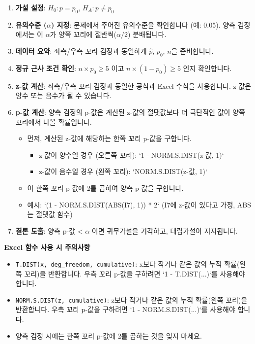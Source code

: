 \documentclass[11pt,a4paper]{article}
\begin{document}
\begin{enumerate}
    \item \textbf{가설 설정}: $H_0: p = p_0$, $H_A: p \ne p_0$
    \item \textbf{유의수준 ($\alpha$) 지정}: 문제에서 주어진 유의수준을 확인합니다 (예: 0.05). 양측 검정에서는 이 $\alpha$가 양쪽 꼬리에 절반씩($\alpha/2$) 분배됩니다.
    \item \textbf{데이터 요약}: 좌측/우측 꼬리 검정과 동일하게 $\hat{p}$, $p_0$, $n$을 준비합니다.
    \item \textbf{정규 근사 조건 확인}: $n \times p_0 \ge 5$ 이고 $n \times (1 - p_0) \ge 5$ 인지 확인합니다.
    \item \textbf{z-값 계산}: 좌측/우측 꼬리 검정과 동일한 공식과 Excel 수식을 사용합니다. z-값은 양수 또는 음수가 될 수 있습니다.
    \item \textbf{p-값 계산}: 양측 검정의 p-값은 계산된 z-값의 절댓값보다 더 극단적인 값이 양쪽 꼬리에서 나올 확률입니다.
    \begin{itemize}
        \item 먼저, 계산된 z-값에 해당하는 한쪽 꼬리 p-값을 구합니다.
        \begin{itemize}
            \item z-값이 양수일 경우 (오른쪽 꼬리): `1 - NORM.S.DIST(z-값, 1)`
            \item z-값이 음수일 경우 (왼쪽 꼬리): `NORM.S.DIST(z-값, 1)`
        \end{itemize}
        \item 이 한쪽 꼬리 p-값에 2를 곱하여 양측 p-값을 구합니다.
        \item 예시: `(1 - NORM.S.DIST(ABS(I7), 1)) * 2` (I7에 z-값이 있다고 가정, ABS는 절댓값 함수)
    \end{itemize}
    \item \textbf{결론 도출}: 양측 p-값 < $\alpha$ 이면 귀무가설을 기각하고, 대립가설이 지지됩니다.
\end{enumerate}

\begin{warningbox}
\textbf{Excel 함수 사용 시 주의사항}
\begin{itemize}
    \item \texttt{T.DIST(x, deg\_freedom, cumulative)}: x보다 작거나 같은 값의 누적 확률(왼쪽 꼬리)을 반환합니다. 우측 꼬리 p-값을 구하려면 `1 - T.DIST(...)`를 사용해야 합니다.
    \item \texttt{NORM.S.DIST(z, cumulative)}: z보다 작거나 같은 값의 누적 확률(왼쪽 꼬리)을 반환합니다. 우측 꼬리 p-값을 구하려면 `1 - NORM.S.DIST(...)`를 사용해야 합니다.
    \item 양측 검정 시에는 한쪽 꼬리 p-값에 2를 곱하는 것을 잊지 마세요.
\end{itemize}
\end{warningbox}
\end{document}
